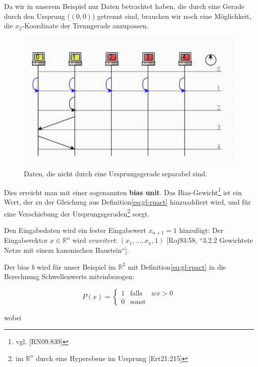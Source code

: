 Da wir in unserem Beispiel nur Daten betrachtet haben, die durch eine Gerade durch den Ursprung ($(0,0)$) getrennt sind, brauchen wir noch eine Möglichkeit, die $x_2$-Koordinate der Trenngerade anzupassen.


\begin{figure}[h]
    \centering
    \includegraphics{images/p1ReadSeq.pdf}
    \caption{Daten, die nicht durch eine Ursprungsgerade separabel sind.}
    \label{fig-nichtseparierbar}
\end{figure}

\noindent
Dies erreicht man mit einer sogenannten \textbf{bias unit}.
Das Bias-Gewicht\footnote{
    vgl. [RN09:839]
} ist ein Wert, der zu der Gleichung aus Definition\ref{eq:gl-rpact} hinzuaddiert wird, und für eine Verschiebung der Ursprungsgeraden\footnote{
    im $ \mathbb{R}^n$ durch eine Hyperebene im Ursprung [Ert21:215]
} sorgt.

Den Eingabedaten wird ein fester Eingabewert $x_{n+1} = 1$ hinzufügt: Der Eingabevektor $x \in  \mathbb{R}^n$ wird \textit{erweitert}: $(x_1, ..., x_n, 1)$ [Roj93:58, ``3.2.2 Gewichtete Netze mit einem kanonischen Baustein``].

\noindent
Der bias $b$ wird für unser Beispiel im $ \mathbb{R}^2$ mit Definition\ref{eq:gl-rpact} in die Berechnung Schwellenwerts miteinbezogen:

\begin{equation}
P(x) = \begin{cases}
            1 &\text{falls} &wx > 0 \\
            0 &\text{sonst}
\end{cases}
\end{equation}

\noindent
wobei

